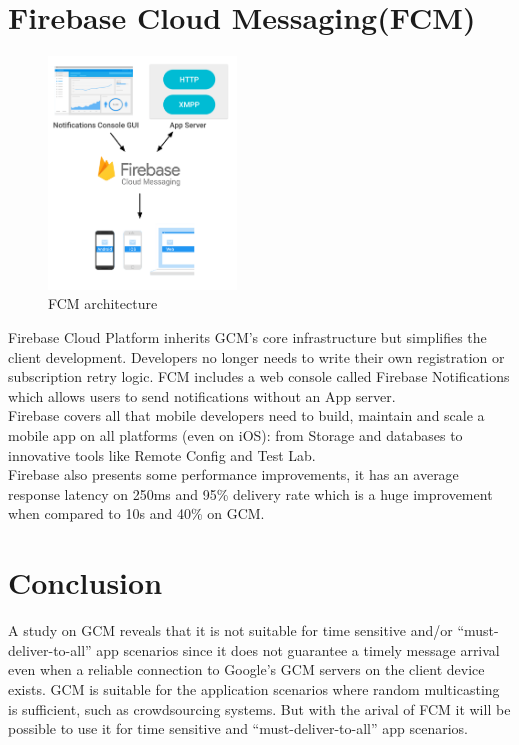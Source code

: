 \section{Firebase Cloud Messaging(FCM)}
\begin{figure}[!htb]
\centering
\includegraphics[width=5cm]{images/fcm.png}
\caption{\label{fig:fcm}FCM architecture}
\end{figure}
Firebase Cloud Platform inherits GCM’s core infrastructure but simplifies the client development. Developers no longer needs to write their own registration or subscription retry logic. FCM includes a web console called Firebase Notifications which allows users to send notifications without an App server.\\
Firebase covers all that mobile developers need to build, maintain and scale a mobile app on all platforms (even on iOS): from Storage and databases to innovative tools like Remote Config and Test Lab.\\
Firebase also presents some performance improvements, it has an average response latency on 250ms and  95\% delivery rate which is a huge improvement when compared to 10s and 40\% on GCM.
\section{Conclusion}
A study on GCM reveals that it is not suitable for time sensitive and/or “must-deliver-to-all” app
scenarios since it does not guarantee a timely message arrival even when a reliable
connection to Google’s GCM servers on the client device exists. GCM is suitable for the application scenarios
where random multicasting is sufficient, such as crowdsourcing
systems. But with the arival of FCM it will be possible to use it for time sensitive and “must-deliver-to-all” app
scenarios.   


